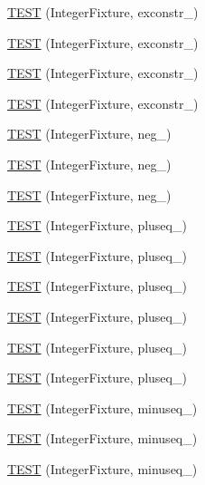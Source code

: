 \begin{DoxyCompactItemize}
\item 
\hyperlink{TestInteger_8c_09_09_a7572d20549614943acf2b206bf8c7899}{T\-E\-S\-T} (Integer\-Fixture, exconstr\-\_)
\item 
\hyperlink{TestInteger_8c_09_09_acde7e3b3ff632f23cf3b8d633ecde05c}{T\-E\-S\-T} (Integer\-Fixture, exconstr\-\_)
\item 
\hyperlink{TestInteger_8c_09_09_a3623d5574ec020e7fa525d049f194b1e}{T\-E\-S\-T} (Integer\-Fixture, exconstr\-\_)
\item 
\hyperlink{TestInteger_8c_09_09_ab7662c31f8e58ee17468b69260afd20f}{T\-E\-S\-T} (Integer\-Fixture, exconstr\-\_)
\item 
\hyperlink{TestInteger_8c_09_09_ad8a5e6617e7dd5f61983704b7fd79ea8}{T\-E\-S\-T} (Integer\-Fixture, neg\-\_)
\item 
\hyperlink{TestInteger_8c_09_09_a0e6e1ccab25f97b2fe99457d84d05e74}{T\-E\-S\-T} (Integer\-Fixture, neg\-\_)
\item 
\hyperlink{TestInteger_8c_09_09_ad2df86616b1f055a31f00fd24855e797}{T\-E\-S\-T} (Integer\-Fixture, neg\-\_)
\item 
\hyperlink{TestInteger_8c_09_09_a1d062acc3d01ac8c8942481a9aceaaf9}{T\-E\-S\-T} (Integer\-Fixture, pluseq\-\_)
\item 
\hyperlink{TestInteger_8c_09_09_ae64f794b1697a80d5b4e97b39c419b0c}{T\-E\-S\-T} (Integer\-Fixture, pluseq\-\_)
\item 
\hyperlink{TestInteger_8c_09_09_aa78d804e31e80bc4ef7b8780ffb04180}{T\-E\-S\-T} (Integer\-Fixture, pluseq\-\_)
\item 
\hyperlink{TestInteger_8c_09_09_ac9a105d3a52e55cf2a431d1cfb6bd258}{T\-E\-S\-T} (Integer\-Fixture, pluseq\-\_)
\item 
\hyperlink{TestInteger_8c_09_09_a7365f06695ad37af5d01d1483c8a5196}{T\-E\-S\-T} (Integer\-Fixture, pluseq\-\_)
\item 
\hyperlink{TestInteger_8c_09_09_ac00cba5f395d297236d512744bed85cf}{T\-E\-S\-T} (Integer\-Fixture, pluseq\-\_)
\item 
\hyperlink{TestInteger_8c_09_09_a7c67394d2a773f6d5ec5fc67aaffd486}{T\-E\-S\-T} (Integer\-Fixture, minuseq\-\_)
\item 
\hyperlink{TestInteger_8c_09_09_a6d5b55fb86b2d1c05eeacec27f29c532}{T\-E\-S\-T} (Integer\-Fixture, minuseq\-\_)
\item 
\hyperlink{TestInteger_8c_09_09_a02e4a6e3e6d34ee3b192df58b5b42d9c}{T\-E\-S\-T} (Integer\-Fixture, minuseq\-\_)
\item 

\end{DoxyCompactItemize}
